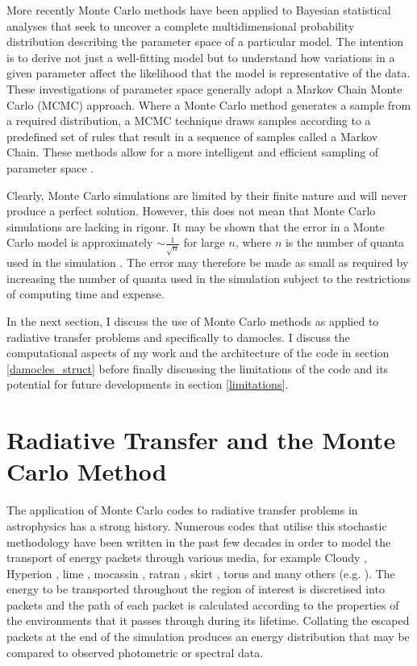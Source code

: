 More recently Monte Carlo methods have been applied to Bayesian statistical analyses that seek to uncover a complete multidimensional probability distribution describing the parameter space of a particular model.  The intention is to derive not just a well-fitting model but to understand how variations in a given parameter affect the likelihood that the model is representative of the data.  These investigations of parameter space generally adopt a Markov Chain Monte Carlo (MCMC) approach.  Where a Monte Carlo method generates a sample from a required distribution, a MCMC technique draws samples according to a predefined set of rules that result in a sequence of samples called a Markov Chain.  These methods allow for a more intelligent and efficient sampling of parameter space \citep{Metropolis1953, Hastings1970, Gilks1996}.  

Clearly, Monte Carlo simulations are limited by their finite nature and will never produce a perfect solution.  However, this does not mean that Monte Carlo simulations are lacking in rigour.  It may be shown that the error in a Monte Carlo model is approximately $\sim \frac{1}{\sqrt{n}}$ for large $n$, where $n$ is the number of quanta used in the simulation \citep{Press2007}.  The error may therefore be made as small as required by increasing the number of quanta used in the simulation subject to the restrictions of computing time and expense.

In the next section, I discuss the use of Monte Carlo methods as applied to radiative transfer problems and specifically to {\sc damocles}.  I discuss the computational aspects of my work and the architecture of the code in section \ref{damocles_struct} before finally discussing the limitations of the code and its potential for future developments in section \ref{limitations}.

\section{Radiative Transfer and the Monte Carlo Method}
\label{rt}

The application of Monte Carlo codes to radiative transfer problems in astrophysics has a strong history.  Numerous codes that utilise this stochastic methodology have been written in the past few decades in order to model the transport of energy packets through various media, for example Cloudy \citep{Ferland2013}, Hyperion \citep{Robitaille2011}, {\sc lime} \citep{Brinch2010}, {\sc mocassin} \citep{Ercolano2003, Ercolano2005}, {\sc ratran} \citep{Hogerheijde2000}, {\sc skirt} \citep{Baes2003}, {\sc torus} \citep{Harries2000} and many others (e.g. \citep{Wood2001}).  The energy to be transported throughout the region of interest is discretised into packets and the path of each packet is calculated according to the properties of the environments that it passes through during its lifetime.  Collating the escaped packets at the end of the simulation produces an energy distribution that may be compared to observed photometric or spectral data. 


